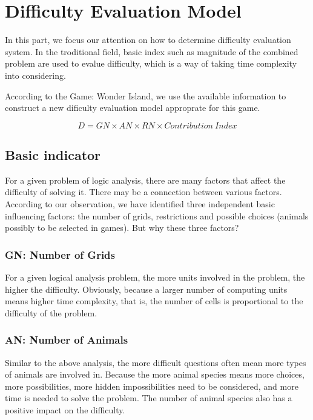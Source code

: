 \documentclass{mcmthesis}
\begin{document}
	\section{Difficulty Evaluation Model}
	
		In this part, we focus our attention on how to determine difficulty evaluation system. In the troditional field, basic index such as magnitude of the combined problem are used to evalue difficulty, which is a way of taking time complexity into considering.
		
		According to the Game: Wonder Island, we use the available information to construct a new dificulty evaluation model approprate for this game.
		
		\begin{equation}
		D = GN \times AN \times RN \times Contribution\ Index
		\end{equation}
		
		\subsection{Basic indicator}
	
			For a given problem of logic analysis, there are many factors that affect the difficulty of solving it. There may be a connection between various factors. According to our observation, we have identified three independent basic influencing factors: the number of grids, restrictions and possible choices (animals possibly to be selected in games). But why these three factors?
		
			\subsubsection{GN: Number of Grids}
	
				For a given logical analysis problem, the more units involved in the problem, the higher the difficulty. Obviously, because a larger number of computing units means higher time complexity, that is, the number of cells is proportional to the difficulty of the problem.
				
			
			\subsubsection{AN: Number of Animals}
				
				Similar to the above analysis, the more difficult questions often mean more types of animals are involved in. Because the more animal species means more choices, more possibilities, more hidden impossibilities need to be considered, and more time is needed to solve the problem. The number of animal species also has a positive impact on the difficulty.
				
\end{document}
